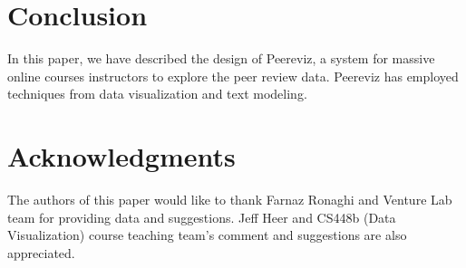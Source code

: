 \documentclass{sigchi}
\begin{document}
\section{Conclusion}

In this paper, we have described the design of Peereviz, a system for massive online courses
instructors to explore the peer review data.   Peereviz has employed techniques
from data visualization and text modeling.

\section{Acknowledgments}
The authors of this paper would like to thank Farnaz Ronaghi and Venture Lab
team for providing data and suggestions.
Jeff Heer and CS448b (Data Visualization) course teaching team's comment
and suggestions are also appreciated.

%
%
%
%
%



\end{document}

